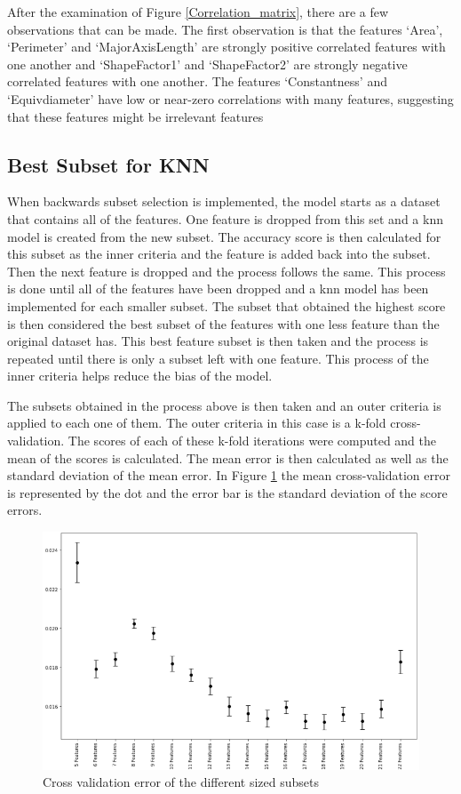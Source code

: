 \documentclass[10pt, conference]{IEEEtran}
\begin{document}
After the examination of Figure \ref{Correlation_matrix}, there are a few observations that can be made. The first observation is that
the features `Area', `Perimeter' and `MajorAxisLength' are strongly positive correlated features with one another and `ShapeFactor1' and
`ShapeFactor2' are strongly negative correlated features with one another.
The features `Constantness' and `Equivdiameter' have low or near-zero correlations with many features, suggesting that these features
might be irrelevant features

\subsection{Best Subset for KNN}

When backwards subset selection is implemented, the model starts as a dataset that contains all of the features. One feature is
dropped from this set and a \acrshort{knn} model is created from the new subset. The accuracy score is then calculated for this
subset as the inner criteria and the feature is added back into the subset. Then the next feature is dropped and the process
follows the same. This process is done until all of the features have been dropped and a \acrshort{knn} model has been implemented
for each smaller subset. The subset that obtained the highest score is then considered the best subset of the features with one
less feature than the original dataset has. This best feature subset is then taken and the process is repeated until there is only a
subset left with one feature. This process of the inner criteria helps reduce the bias of the model.

The subsets obtained in the process above is then taken and an outer criteria is applied to each one of them. The outer criteria in
this case is a k-fold cross-validation. The scores of each of these k-fold iterations were computed and the mean of the scores
is calculated. The mean error is then calculated as well as the standard deviation of the mean error. In Figure \ref{Subset}
the mean cross-validation error is represented by the dot and the error bar is the standard deviation of the score errors.

\begin{figure}[h!]
    \centerline{\includegraphics[scale=0.45]{../Plots/Best_subset.PNG}}
    \caption{Cross validation error of the different sized subsets}
    \label{Subset}
\end{figure}
\end{document}
